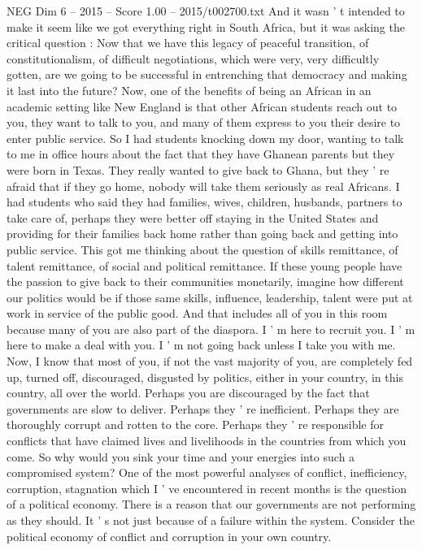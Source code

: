 \begin{textsample}{NEG Dim 6 – 2015 – Score 1.00 – 2015/t002700.txt}
And it wasn ' t intended to make it seem like we got everything right in South Africa, but it was asking the critical question : Now that we have this legacy of peaceful transition, of constitutionalism, of difficult negotiations, which were very, very difficultly gotten, are we going to be successful in entrenching that democracy and making it last into the future?
Now, one of the benefits of being an African in an academic setting like New England is that other African students reach out to you, they want to talk to you, and many of them express to you their desire to enter public service.
So I had students knocking down my door, wanting to talk to me in office hours about the fact that they have Ghanean parents but they were born in Texas.
They really wanted to give back to Ghana, but they ' re afraid that if they go home, nobody will take them seriously as real Africans.
I had students who said they had families, wives, children, husbands, partners to take care of, perhaps they were better off staying in the United States and providing for their families back home rather than going back and getting into public service.
This got me thinking about the question of skills remittance, of talent remittance, of social and political remittance.
If these young people have the passion to give back to their communities monetarily, imagine how different our politics would be if those same skills, influence, leadership, talent were put at work in service of the public good.
And that includes all of you in this room because many of you are also part of the diaspora.
I ' m here to recruit you.
I ' m here to make a deal with you.
I ' m not going back unless I take you with me.
Now, I know that most of you, if not the vast majority of you, are completely fed up, turned off, discouraged, disgusted by politics, either in your country, in this country, all over the world.
Perhaps you are discouraged by the fact that governments are slow to deliver.
Perhaps they ' re inefficient.
Perhaps they are thoroughly corrupt and rotten to the core.
Perhaps they ' re responsible for conflicts that have claimed lives and livelihoods in the countries from which you come.
So why would you sink your time and your energies into such a compromised system?
One of the most powerful analyses of conflict, inefficiency, corruption, stagnation which I ' ve encountered in recent months is the question of a political economy.
There is a reason that our governments are not performing as they should.
It ' s not just because of a failure within the system.
Consider the political economy of conflict and corruption in your own country.

\end{textsample}
